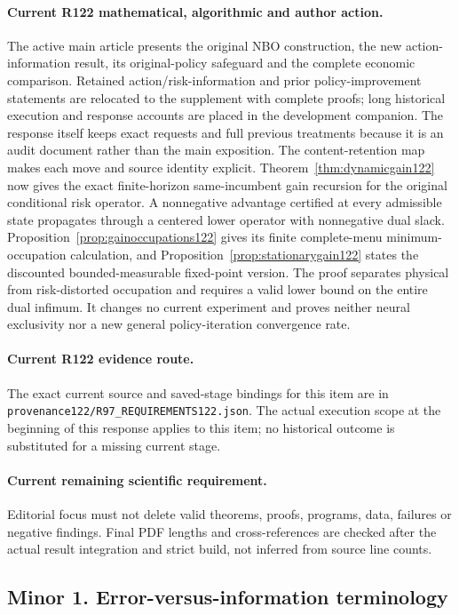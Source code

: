 \paragraph{Current R122 mathematical, algorithmic and author action.}
The active main article presents the original NBO construction, the new action-information result, its original-policy safeguard and the complete economic comparison. Retained action/risk-information and prior policy-improvement statements are relocated to the supplement with complete proofs; long historical execution and response accounts are placed in the development companion. The response itself keeps exact requests and full previous treatments because it is an audit document rather than the main exposition. The content-retention map makes each move and source identity explicit. Theorem~\ref{thm:dynamicgain122} now gives the exact finite-horizon same-incumbent gain recursion for the original conditional risk operator. A nonnegative advantage certified at every admissible state propagates through a centered lower operator with nonnegative dual slack. Proposition~\ref{prop:gainoccupations122} gives its finite complete-menu minimum-occupation calculation, and Proposition~\ref{prop:stationarygain122} states the discounted bounded-measurable fixed-point version. The proof separates physical from risk-distorted occupation and requires a valid lower bound on the entire dual infimum. It changes no current experiment and proves neither neural exclusivity nor a new general policy-iteration convergence rate.
\paragraph{Current R122 evidence route.}
The exact current source and saved-stage bindings for this item are in \nolinkurl{provenance122/R97_REQUIREMENTS122.json}. The actual execution scope at the beginning of this response applies to this item; no historical outcome is substituted for a missing current stage.
\paragraph{Current remaining scientific requirement.}
Editorial focus must not delete valid theorems, proofs, programs, data, failures or negative findings. Final PDF lengths and cross-references are checked after the actual result integration and strict build, not inferred from source line counts.

\subsection{Minor 1. Error-versus-information terminology}
\label{response122:minor-1}

